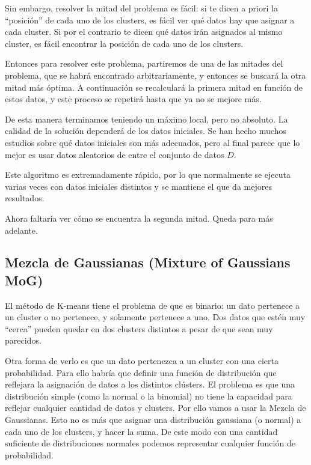 Sin embargo, resolver la mitad del problema es fácil: si te dicen a priori la ``posición'' de cada uno de los clusters, es fácil ver qué datos hay que asignar a cada cluster. Si por el contrario te dicen qué datos irán asignados al mismo cluster, es fácil encontrar la posición de cada uno de los clusters.

Entonces para resolver este problema, partiremos de una de las mitades del problema, que se habrá encontrado arbitrariamente, y entonces se buscará la otra mitad más óptima. A continuación se recalculará la primera mitad en función de estos datos, y este proceso se repetirá hasta que ya no se mejore más.

De esta manera terminamos teniendo un máximo local, pero no absoluto. La calidad de la solución dependerá de los datos iniciales. Se han hecho muchos estudios sobre qué datos iniciales son más adecuados, pero al final parece que lo mejor es usar datos aleatorios de entre el conjunto de datos $D$.

Este algoritmo es extremadamente rápido, por lo que normalmente se ejecuta varias veces con datos iniciales distintos y se mantiene el que da mejores resultados.



Ahora faltaría ver cómo se encuentra la segunda mitad. Queda para más adelante.

\subsection{Mezcla de Gaussianas (Mixture of Gaussians MoG)}

El método de K-means tiene el problema de que es binario: un dato pertenece a un cluster o no pertenece, y solamente pertenece a uno. Dos datos que estén muy ``cerca'' pueden quedar en dos clusters distintos a pesar de que sean muy parecidos.

Otra forma de verlo es que un dato pertenezca a un cluster con una cierta probabilidad. Para ello habría que definir una función de distribución que reflejara la asignación de datos a los distintos clústers. El problema es que una distribución simple (como la normal o la binomial) no tiene la capacidad para reflejar cualquier cantidad de datos y clusters. Por ello vamos a usar la Mezcla de Gaussianas. Esto no es más que asignar una distribución gaussiana (o normal) a cada uno de los clusters, y hacer la suma. De este modo con una cantidad suficiente de distribuciones normales podemos representar cualquier función de probabilidad.

